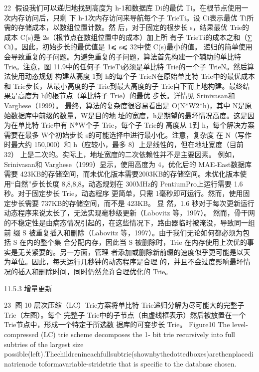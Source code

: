                                                                                            22
假设我们可以递归地找到高度为 h-1和数据库 Di的最优 Ti。在根节点使用一次内存访问后，只剩
下 h-1次内存访问来导航每个子 TrieTi。设 Ci表示最优 Ti所需的存储成本，以数组位置计数。然
后，对于固定的根步长 s，结果最优 Trie的成本 C(s)是 2s（根节点在数组位置中的成本）加上所
有子 TrieTi的成本之和（∑ Ci）。因此，初始步长的最优值是 1⩽ s⩽ 32中使 C(s)最小的值。
递归的简单使用会导致重复的子问题。为避免重复的子问题，算法首先构建一个辅助的单比特
Trie。注意，图 11.9中的任何子 TrieTi必须是单比特 Trie的一个子 TrieN。然后算法使用动态规划
构建从高度 1到 h的每个子 TrieN在原始单比特 Trie中的最优成本和 Trie步长，从最小高度的子
Trie到最大高度的子 Trie自下而上地构建。最终结果是高度为 h的根节点（单比特子 Trie）的最优
步长。详情见 Srinivasan和 Varghese（1999）。
最终，算法的复杂度很容易看出是 O(N*W2*h)，其中 N是原始数据库中前缀的数量，W是目的地
址的宽度，h是期望的最坏情况高度。这是因为在单比特 Trie中有 N*W个子 Trie，每个子 Trie的
高度从 1到 h，每个解决方案需要在最多 W个初始步长 s的可能选择中进行最小化。注意，复杂度
在 N（写作时最大约 150,000）和 h（应较小，最多 8）上是线性的，但在地址宽度（目前 32）
上是二次的。实际上，地址宽度的二次依赖性并不是主要因素。
   例如，Srinivasan和 Varghese（1999）显示，使用高度为 4，优化后的 MAE-East数据库需要
423KB的存储空间，而未优化版本需要2003KB的存储空间。未优化版本使用“自然”步长长度
   8,8,8,8。动态规划在 300MHz的 PentiumPro上运行需要 1.6秒。对于固定步长 Trie，动态程序
更简单，只需 1毫秒即可运行。然而，使用固定步长需要 737KB的存储空间，而不是 423KB。 显
然，1.6 秒对于每次更新运行动态程序来说太长了，无法实现毫秒级更新（Labovitz 等，1997）。
然而，骨干网的不稳定性是由病态情况引起的，在这些情况下，路由器临时被淹没，导致同一组前
缀 S 被重复插入和删除（Labovitz 等，1997）。由于我们无论如何都必须为包括 S 在内的整个集
合分配内存，因此当 S 被删除时，Trie 在内存使用上次优的事实是无关紧要的。另一方面，管理
者添加或删除新前缀的速度似乎更可能是以天为单位。因此，每天运行几秒钟的动态程序是合理
的，并且不会过度影响最坏情况的插入和删除时间，同时仍然允许合理优化的 Trie。



11.5.3 增量更新


                                                            23
图 10 层次压缩（LC）Trie方案将单比特 Trie递归分解为尽可能大的完整子 Trie（左图）。每个
完整子 Trie中的子节点（由虚线框表示）然后被放置在一个 Trie节点中，形成一个特定于所选数
据库的可变步长 Trie。 Figure10 The level-compressed (LC) trie scheme decomposes the 1-
bit trie recursively into full subtries of the largest size
possible(left).Thechildrenineachfullsubtrie(shownbythedottedboxes)arethenplacedinatrienode
toformavariable-stridetrie that is specific to the database chosen.

